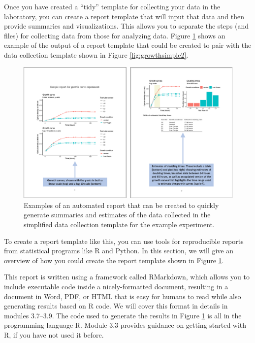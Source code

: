 \documentclass[]{tufte-book}
\begin{document}
Once you have created a ``tidy'' template for collecting your data in the
laboratory, you can create a report template that will input that data and then
provide summaries and visualizations. This allows you to separate the steps (and
files) for collecting data from those for analyzing data. Figure
\ref{fig:growthreport2} shows an example of the output of a report template
that could be created to pair with the data collection template shown in Figure
\ref{fig:growthsimple2}.

\begin{figure}
\includegraphics[width=\textwidth]{figures/growth_curve_report} \caption[Examples of an automated report that can be created to quickly generate summaries and estimates of the data collected in the simplified data collection template for the example experiment]{Examples of an automated report that can be created to quickly generate summaries and estimates of the data collected in the simplified data collection template for the example experiment.}\label{fig:growthreport2}
\end{figure}

To create a report template like this, you can use tools for reproducible
reports from statistical programs like R and Python. In this section, we will
give an overview of how you could create the report template shown in Figure
\ref{fig:growthreport2}.

This report is written using a framework called RMarkdown, which allows you to
include executable code inside a nicely-formatted document, resulting in a
document in Word, PDF, or HTML that is easy for humans to read while also
generating results based on R code. We will cover this format in details in
modules 3.7--3.9. The code used to generate the results in Figure
\ref{fig:growthreport2} is all in the programming language R. Module 3.3
provides guidance on getting started with R, if you have not used it before.
\end{document}
